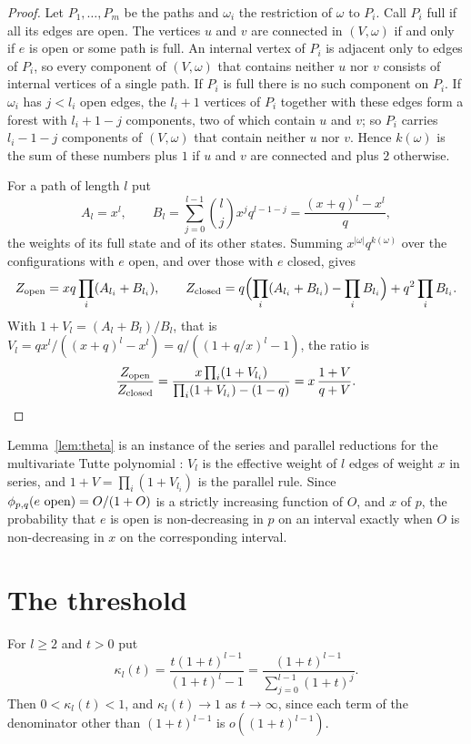 \documentclass[11pt]{amsart}
\theoremstyle{remark}
\numberwithin{equation}{section}
\newcommand{\open}{\ \textup{open}}
\begin{document}
\begin{proof}
Let $P_1,\dots,P_m$ be the paths and $\omega_i$ the restriction of $\omega$ to $P_i$. Call $P_i$ full if all its edges are open. The vertices $u$ and $v$ are connected in $(V,\omega)$ if and only if $e$ is open or some path is full. An internal vertex of $P_i$ is adjacent only to edges of $P_i$, so every component of $(V,\omega)$ that contains neither $u$ nor $v$ consists of internal vertices of a single path. If $P_i$ is full there is no such component on $P_i$. If $\omega_i$ has $j<l_i$ open edges, the $l_i+1$ vertices of $P_i$ together with these edges form a forest with $l_i+1-j$ components, two of which contain $u$ and $v$; so $P_i$ carries $l_i-1-j$ components of $(V,\omega)$ that contain neither $u$ nor $v$. Hence $k(\omega)$ is the sum of these numbers plus $1$ if $u$ and $v$ are connected and plus $2$ otherwise.

For a path of length $l$ put
\[
 A_l=x^l,\qquad B_l=\sum_{j=0}^{l-1}\binom lj x^jq^{l-1-j}=\frac{(x+q)^l-x^l}{q},
\]
the weights of its full state and of its other states. Summing $x^{|\omega|}q^{k(\omega)}$ over the configurations with $e$ open, and over those with $e$ closed, gives
\[
 Z_{\rm open}=xq\prod_{i}(A_{l_i}+B_{l_i}),\qquad
 Z_{\rm closed}=q\Bigl(\prod_i(A_{l_i}+B_{l_i})-\prod_iB_{l_i}\Bigr)+q^2\prod_iB_{l_i}.
\]
With $1+V_l=(A_l+B_l)/B_l$, that is $V_l=qx^l/((x+q)^l-x^l)=q/((1+q/x)^l-1)$, the ratio is
\[
 \frac{Z_{\rm open}}{Z_{\rm closed}}=\frac{x\prod_i(1+V_{l_i})}{\prod_i(1+V_{l_i})-(1-q)}=x\,\frac{1+V}{q+V}.\qedhere
\]
\end{proof}

Lemma~\ref{lem:theta} is an instance of the series and parallel reductions for the multivariate Tutte polynomial \cite{Sok05}: $V_l$ is the effective weight of $l$ edges of weight $x$ in series, and $1+V=\prod_i(1+V_{l_i})$ is the parallel rule. Since $\phi_{p,q}(e\open)=O/(1+O)$ is a strictly increasing function of $O$, and $x$ of $p$, the probability that $e$ is open is non-decreasing in $p$ on an interval exactly when $O$ is non-decreasing in $x$ on the corresponding interval.

\section{The threshold}\label{sec:threshold}

For $l\ge2$ and $t>0$ put
\[
 \kappa_l(t)=\frac{t(1+t)^{l-1}}{(1+t)^l-1}=\frac{(1+t)^{l-1}}{\sum_{j=0}^{l-1}(1+t)^j}.
\]
Then $0<\kappa_l(t)<1$, and $\kappa_l(t)\to1$ as $t\to\infty$, since each term of the denominator other than $(1+t)^{l-1}$ is $o((1+t)^{l-1})$.
\end{document}
